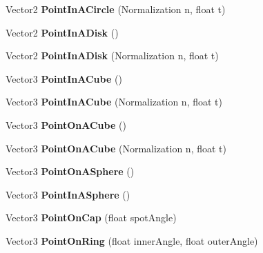 \begin{DoxyCompactItemize}
\item 
\hypertarget{class_m_t_random_a553c19d7dc936ccabc411b46dca83be3}{Vector2 {\bfseries Point\+In\+A\+Circle} (Normalization n, float t)}\label{class_m_t_random_a553c19d7dc936ccabc411b46dca83be3}

\item 
\hypertarget{class_m_t_random_a4ef4c9e90cbd576168827b38a92c12bd}{Vector2 {\bfseries Point\+In\+A\+Disk} ()}\label{class_m_t_random_a4ef4c9e90cbd576168827b38a92c12bd}

\item 
\hypertarget{class_m_t_random_a80193b6a2351fe862097479aad6eba24}{Vector2 {\bfseries Point\+In\+A\+Disk} (Normalization n, float t)}\label{class_m_t_random_a80193b6a2351fe862097479aad6eba24}

\item 
\hypertarget{class_m_t_random_a37ad054ace9ab2d9853e633618a0f841}{Vector3 {\bfseries Point\+In\+A\+Cube} ()}\label{class_m_t_random_a37ad054ace9ab2d9853e633618a0f841}

\item 
\hypertarget{class_m_t_random_ace356958f5a49e7fd57dfac834df576c}{Vector3 {\bfseries Point\+In\+A\+Cube} (Normalization n, float t)}\label{class_m_t_random_ace356958f5a49e7fd57dfac834df576c}

\item 
\hypertarget{class_m_t_random_a181c5763ec6fc54ce32b03e5e8b70999}{Vector3 {\bfseries Point\+On\+A\+Cube} ()}\label{class_m_t_random_a181c5763ec6fc54ce32b03e5e8b70999}

\item 
\hypertarget{class_m_t_random_a35b79e5690fc372501c9116db5d4edbf}{Vector3 {\bfseries Point\+On\+A\+Cube} (Normalization n, float t)}\label{class_m_t_random_a35b79e5690fc372501c9116db5d4edbf}

\item 
\hypertarget{class_m_t_random_a6af47a9f988ce9b163455b1abfb4e12d}{Vector3 {\bfseries Point\+On\+A\+Sphere} ()}\label{class_m_t_random_a6af47a9f988ce9b163455b1abfb4e12d}

\item 
\hypertarget{class_m_t_random_a8a4ffd8278d115d6b840b872a92cf6b4}{Vector3 {\bfseries Point\+In\+A\+Sphere} ()}\label{class_m_t_random_a8a4ffd8278d115d6b840b872a92cf6b4}

\item 
\hypertarget{class_m_t_random_ab3d4e8b9af933503afbd3640da7ae2ec}{Vector3 {\bfseries Point\+On\+Cap} (float spot\+Angle)}\label{class_m_t_random_ab3d4e8b9af933503afbd3640da7ae2ec}

\item 
\hypertarget{class_m_t_random_ad33764572f7d2aee6aa83e5b2539cc73}{Vector3 {\bfseries Point\+On\+Ring} (float inner\+Angle, float outer\+Angle)}\label{class_m_t_random_ad33764572f7d2aee6aa83e5b2539cc73}

\end{DoxyCompactItemize}
